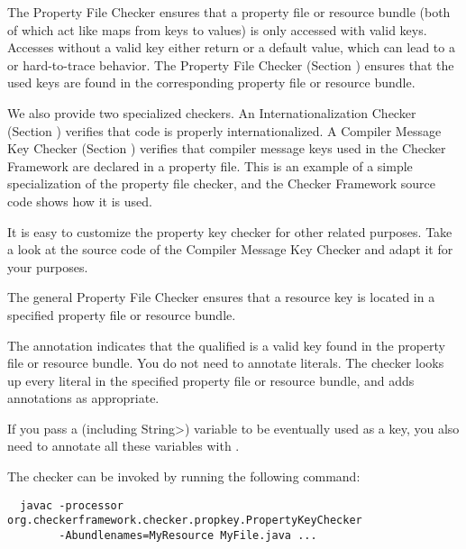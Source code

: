 \htmlhr
{}

The Property File Checker ensures that a property file or resource bundle (both
of which act like maps from keys to values) is only accessed with valid keys.
Accesses without a valid key either return  or a default value, which
can lead to a  or hard-to-trace behavior.
The Property File Checker (Section ) ensures
that the used keys are found in the corresponding property file or resource
bundle.

We also provide two specialized checkers.
An Internationalization Checker (Section )
verifies that code is properly internationalized.
A Compiler Message Key Checker (Section )
verifies that compiler message keys used in the Checker Framework are
declared in a property file.
This is an example of a simple specialization of the property
file checker, and the Checker Framework source code shows how it is used.

It is easy to customize the property key checker for other related purposes.
Take a look at the source code of the Compiler Message Key Checker and adapt it for
your purposes.




The general Property File Checker ensures that a resource key is located
in a specified property file or resource bundle.


The annotation 
indicates that the qualified  is a valid key
found in the property file or resource bundle.
You do not need to annotate  literals.
The checker looks up every  literal in the specified
property file or resource bundle, and adds annotations as appropriate.

If you pass a  (including \<String>) variable to be
eventually used as a key, you
also need to annotate all these variables with .


The checker can be invoked by running the following
command:

\begin{Verbatim}
  javac -processor org.checkerframework.checker.propkey.PropertyKeyChecker
        -Abundlenames=MyResource MyFile.java ...
\end{Verbatim}

